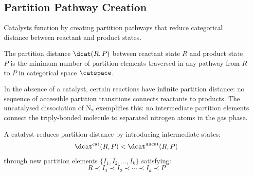 \subsection{Partition Pathway Creation}

Catalysts function by creating partition pathways that reduce categorical distance between reactant and product states.

\begin{definition}
\label{def:partition_dist}
The partition distance $\dcat(R, P)$ between reactant state $R$ and product state $P$ is the minimum number of partition elements traversed in any pathway from $R$ to $P$ in categorical space $\catspace$.
\end{definition}

In the absence of a catalyst, certain reactions have infinite partition distance: no sequence of accessible partition transitions connects reactants to products. The uncatalysed dissociation of N$_2$ exemplifies this: no intermediate partition elements connect the triply-bonded molecule to separated nitrogen atoms in the gas phase.

\begin{theorem}
\label{thm:pathway_creation}
A catalyst reduces partition distance by introducing intermediate states:
\begin{equation}
\dcat^{\mathrm{cat}}(R, P) < \dcat^{\mathrm{uncat}}(R, P)
\end{equation}
through new partition elements $\{I_1, I_2, \ldots, I_k\}$ satisfying:
\begin{equation}
R \prec I_1 \prec I_2 \prec \cdots \prec I_k \prec P
\end{equation}
\end{theorem}

